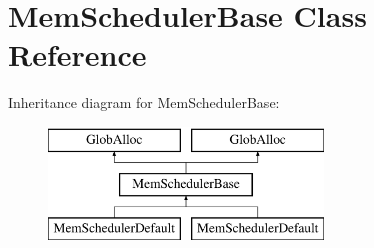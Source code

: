 \hypertarget{classMemSchedulerBase}{\section{Mem\-Scheduler\-Base Class Reference}
\label{classMemSchedulerBase}
}
Inheritance diagram for Mem\-Scheduler\-Base\-:\begin{figure}[H]
\begin{center}
\leavevmode
\includegraphics[height=3.000000cm]{classMemSchedulerBase}
\end{center}
\end{figure}
